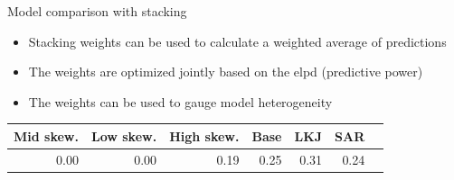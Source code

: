 \begin{frame}{Model comparison with stacking}
    \begin{itemize}
        \item Stacking weights can be used to calculate a weighted average of predictions \cite{gelman_bayesian_2020}
        \item The weights are optimized jointly based on the elpd (predictive power)
        \item The weights can be used to gauge model heterogeneity
    \end{itemize}
    \begin{table}[ht]
        \begin{center}
            \begin{tabular}{rrrrrrr}
                \hline
                Mid skew. & Low skew. & High skew. & Base & LKJ & SAR \\
                \hline
                0.00 & 0.00 & 0.19 & 0.25 & 0.31 & 0.24 \\
                \hline
            \end{tabular}
        \end{center}
    \end{table}
\end{frame}